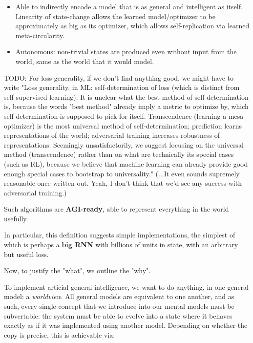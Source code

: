 \documentclass{article}
\begin{document}
\begin{itemize}
\begin{itemize}
\item Able to indirectly encode a model that is as general and intelligent as itself. Linearity of state-change allows the learned model/optimizer to be approximately as big as its optimizer, which allows self-replication via learned meta-circularity.
\item Autonomous: non-trivial states are produced even without input from the world, same as the world that it would model.
\end{itemize}
\end{itemize}

    TODO: For loss generality, if we don't find anything good, we might have to write "Loss generality, in ML: self-determination of loss (which is distinct from self-supervised learning). It is unclear what the best method of self-determination is, because the words "best method" already imply a metric to optimize by, which self-determination is supposed to pick for itself. Transcendence (learning a mesa-optimizer) is the most universal method of self-determination; prediction learns representations of the world; adversarial training increases robustness of representations. Seemingly unsatisfactorily, we suggest focusing on the universal method (transcendence) rather than on what are technically its special cases (such as RL), because we believe that machine learning can already provide good enough special cases to bootstrap to universality." (...It even sounds supremely reasonable once written out. Yeah, I don't think that we'd see any success with adversarial training.)

Such algorithms are \textbf{AGI-ready}, able to represent everything in the world usefully.

In particular, this definition suggests simple implementations, the simplest of which is perhaps a \textbf{big RNN} with billions of units in state, with an arbitrary but useful loss.

Now, to justify the "what", we outline the "why".

To implement articial general intelligence, we want to do anything, in one general model: a \textit{worldview}. All general models are equivalent to one another, and as such, every single concept that we introduce into our mental models must be subvertable: the system must be able to evolve into a state where it behaves exactly as if it was implemented using another model. Depending on whether the copy is precise, this is achievable via:
\end{document}
